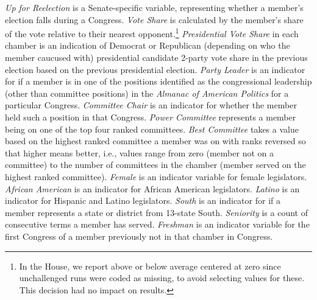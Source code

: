 \documentclass[12pt]{article}
\begin{document}
\textit{Up for Reelection} is a Senate-specific variable, representing whether a member's election falls during a Congress.
\textit{Vote Share} is calculated by the member's share of the vote relative to their nearest opponent.\footnote{\doublespacing\normalsize In the House, we report above or below average centered at zero since unchallenged runs were coded as missing, to avoid selecting values for these. This decision had no impact on results.}  \textit{Presidential Vote Share} in each chamber is an indication of Democrat or Republican (depending on who the member caucused with) presidential candidate 2-party vote share in the previous election based on the previous presidential election.  \textit{Party Leader} is an indicator for if a member is in one of the positions identified as the congressional leadership (other than committee positions) in the \textit{Almanac of American Politics} for a particular Congress. \textit{Committee Chair} is an indicator for whether the member held such a position in that Congress.  \textit{Power Committee} represents a member being on one of the top four ranked committees.  \textit{Best Committee} takes a value based on the highest ranked committee a member was on with ranks reversed so that higher means better, i.e., values range from zero (member not on a committee) to the number of committees in the chamber (member served on the highest ranked committee).  \textit{Female} is an indicator variable for female legislators.  \textit{African American} is an indicator for African American legislators.  \textit{Latino} is an indicator for Hispanic and Latino legislators.  \textit{South} is an indicator for if a member represents a state or district from 13-state South.  \textit{Seniority} is a count of consecutive terms a member has served.  \textit{Freshman} is an indicator variable for the first Congress of a member previously not in that chamber in Congress.
\end{document}
